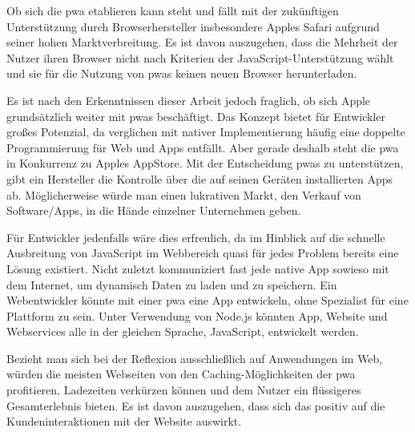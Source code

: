 Ob sich die \ac{pwa} etablieren kann steht und fällt mit der zukünftigen Unterstützung durch Browserhersteller insbesondere Apples Safari aufgrund seiner hohen Marktverbreitung. Es ist davon auszugehen, dass die Mehrheit der Nutzer ihren Browser nicht nach Kriterien der JavaScript-Unterstützung wählt und sie für die Nutzung von \ac{pwa}s keinen neuen Browser herunterladen.

Es ist nach den Erkenntnissen dieser Arbeit jedoch fraglich, ob sich Apple grundsätzlich weiter mit \ac{pwa}s beschäftigt. Das Konzept bietet für Entwickler großes Potenzial, da verglichen mit nativer Implementierung häufig eine doppelte Programmierung für Web und Apps entfällt. Aber gerade deshalb steht die \ac{pwa} in Konkurrenz zu Apples AppStore. Mit der Entscheidung \ac{pwa}s zu unterstützen, gibt ein Hersteller die Kontrolle über die auf seinen Geräten installierten Apps ab. 
Möglicherweise würde man einen lukrativen Markt, den Verkauf von Software/Apps, in die Hände einzelner Unternehmen geben.

Für Entwickler jedenfalls wäre dies erfreulich, da im Hinblick auf die schnelle Ausbreitung von JavaScript im Webbereich quasi für jedes Problem bereits eine Lösung existiert. Nicht zuletzt kommuniziert fast jede native App sowieso mit dem Internet, um dynamisch Daten zu laden und zu speichern. Ein Webentwickler könnte mit einer \ac{pwa} eine App entwickeln, ohne Spezialist für eine Plattform zu sein. Unter Verwendung von Node.js könnten App, Website und Webservices alle in der gleichen Sprache, JavaScript, entwickelt werden.

Bezieht man sich bei der Reflexion ausschließlich auf Anwendungen im Web, würden die meisten Webseiten von den Caching-Möglichkeiten der \ac{pwa} profitieren, Ladezeiten verkürzen können und dem Nutzer ein flüssigeres Gesamterlebnis bieten. Es ist davon auszugehen, dass sich das positiv auf die Kundeninteraktionen mit der Website auswirkt.
